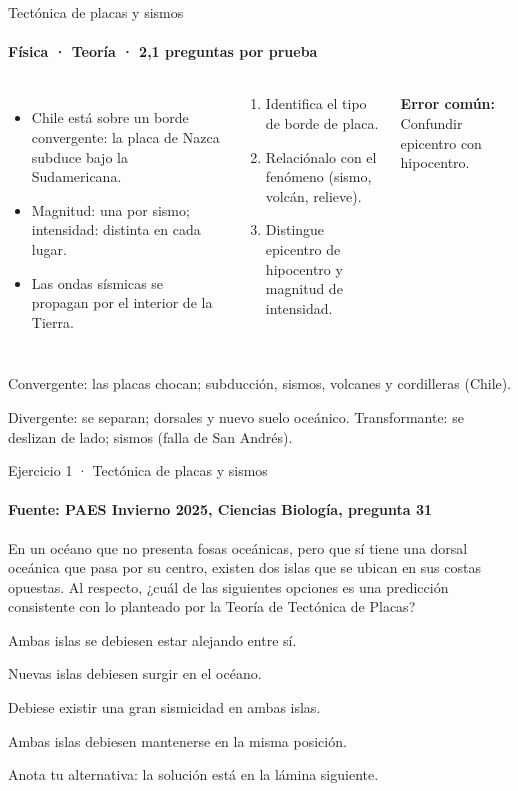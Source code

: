 \documentclass[aspectratio=169,11pt]{beamer}
\newcommand{\alternativa}[2]{\begin{opcion}\tecla{#1}\hspace{0.6em}#2\end{opcion}}
\newlength{\ajustealto}
\newenvironment{ajustar}[1][0.74\textheight]
  {\setlength{\ajustealto}{#1}\begin{lrbox}{\ajustecaja}\begin{minipage}{\textwidth}}
  {\end{minipage}\end{lrbox}%
   \ifdim\dimexpr\ht\ajustecaja+\dp\ajustecaja\relax>\ajustealto
     \resizebox*{!}{\ajustealto}{\usebox{\ajustecaja}}\else\usebox{\ajustecaja}\fi}
\begin{document}
\begin{frame}{Tectónica de placas y sismos}
\label{tema-cs-tierra}
\framesubtitle{Física · Teoría · 2,1 preguntas por prueba}
\begin{ajustar}
\begin{columns}[T,onlytextwidth]
\begin{itemize}\footnotesize
\item Chile está sobre un borde convergente: la placa de Nazca subduce bajo la Sudamericana.
\item Magnitud: una por sismo; intensidad: distinta en cada lugar.
\item Las ondas sísmicas se propagan por el interior de la Tierra.
\end{itemize}
\begin{cajaregla}\scriptsize \begin{enumerate}\item Identifica el tipo de borde de placa.\item Relaciónalo con el fenómeno (sismo, volcán, relieve).\item Distingue epicentro de hipocentro y magnitud de intensidad.\end{enumerate}\end{cajaregla}
\begin{notagris}\scriptsize \textbf{Error común:} Confundir epicentro con hipocentro.\end{notagris}
\end{columns}
\begin{cajaclave}\footnotesize
Convergente: las placas chocan; subducción, sismos, volcanes y cordilleras (Chile).

Divergente: se separan; dorsales y nuevo suelo oceánico. Transformante: se deslizan de lado; sismos (falla de San Andrés).
\end{cajaclave}
\end{ajustar}
\end{frame}

\begin{frame}{Ejercicio 1 · Tectónica de placas y sismos}
\framesubtitle{Fuente: PAES Invierno 2025, Ciencias Biología, pregunta 31}
\begin{ajustar}[0.7\textheight]
{\small En un océano que no presenta fosas oceánicas, pero que sí tiene una dorsal oceánica que pasa por su centro, existen dos islas que se ubican en sus costas opuestas. Al respecto, ¿cuál de las siguientes opciones es una predicción consistente con lo planteado por la Teoría de Tectónica de Placas?}
\vspace{0.4em}
\alternativa{A}{Ambas islas se debiesen estar alejando entre sí.}
\alternativa{B}{Nuevas islas debiesen surgir en el océano.}
\alternativa{C}{Debiese existir una gran sismicidad en ambas islas.}
\alternativa{D}{Ambas islas debiesen mantenerse en la misma posición.}
\end{ajustar}
\vfill{\tiny\color{zinc500}\hfill Anota tu alternativa: la solución está en la lámina siguiente.}
\end{frame}
\end{document}
